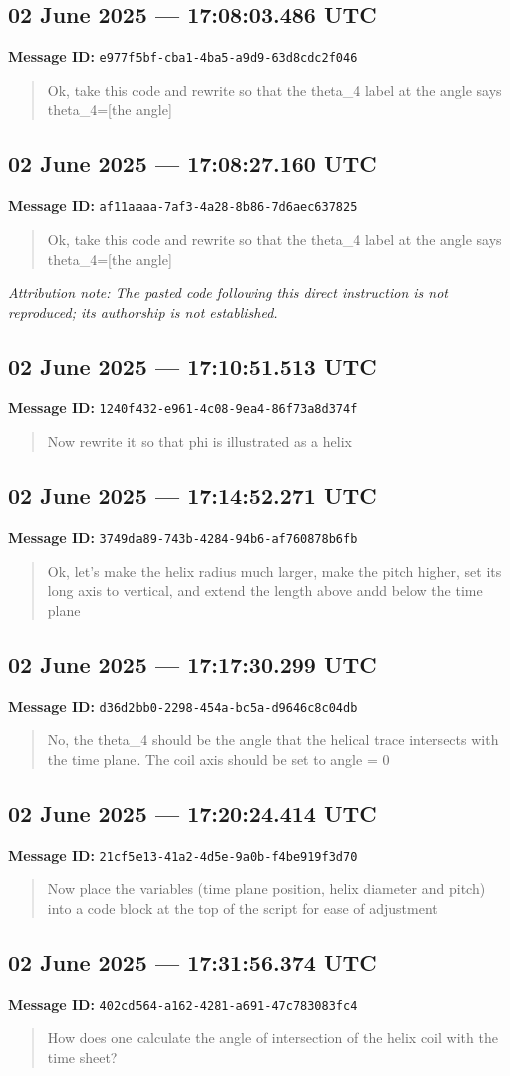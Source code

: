 \documentclass[11pt,letterpaper]{article}
\newcommand{\messageentry}[3]{%
  \Needspace{7\baselineskip}
  \subsection*{#1}
  {\small\textbf{Message ID:} \texttt{#2}}
  \vspace{2pt}
}
\begin{document}
\messageentry{02 June 2025 --- 17:08:03.486 UTC}{e977f5bf-cba1-4ba5-a9d9-63d8cdc2f046}{}
\begin{quote}\small
Ok, take this code and rewrite so that the theta\_4 label at the angle says theta\_4=[the angle]
\end{quote}

\messageentry{02 June 2025 --- 17:08:27.160 UTC}{af11aaaa-7af3-4a28-8b86-7d6aec637825}{}
\begin{quote}\small
Ok, take this code and rewrite so that the theta\_4 label at the angle says theta\_4=[the angle]
\end{quote}

{\small\emph{Attribution note: The pasted code following this direct instruction is not reproduced; its authorship is not established.}}

\messageentry{02 June 2025 --- 17:10:51.513 UTC}{1240f432-e961-4c08-9ea4-86f73a8d374f}{}
\begin{quote}\small
Now rewrite it so that phi is illustrated as a helix
\end{quote}

\messageentry{02 June 2025 --- 17:14:52.271 UTC}{3749da89-743b-4284-94b6-af760878b6fb}{}
\begin{quote}\small
Ok, let's make the helix radius much larger, make the pitch higher, set its long axis to vertical, and extend the length above andd below the time plane
\end{quote}

\messageentry{02 June 2025 --- 17:17:30.299 UTC}{d36d2bb0-2298-454a-bc5a-d9646c8c04db}{}
\begin{quote}\small
No, the theta\_4 should be the angle that the helical trace intersects with the time plane. The coil axis should be set to angle = 0
\end{quote}

\messageentry{02 June 2025 --- 17:20:24.414 UTC}{21cf5e13-41a2-4d5e-9a0b-f4be919f3d70}{}
\begin{quote}\small
Now place the variables (time plane position, helix diameter and pitch) into a code block at the top of the script for ease of adjustment
\end{quote}

\messageentry{02 June 2025 --- 17:31:56.374 UTC}{402cd564-a162-4281-a691-47c783083fc4}{}
\begin{quote}\small
How does one calculate the angle of intersection of the helix coil with the time sheet?
\end{quote}
\end{document}
